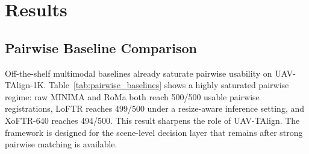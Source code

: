 
\section{Results}

\subsection{Pairwise Baseline Comparison}

Off-the-shelf multimodal baselines already saturate pairwise usability on UAV-TAlign-1K.
Table~\ref{tab:pairwise_baselines} shows a highly saturated pairwise regime: raw MINIMA and RoMa
both reach 500/500 usable pairwise registrations, LoFTR reaches 499/500 under a resize-aware
inference setting, and XoFTR-640 reaches 494/500. This result sharpens the role of UAV-TAlign. The
framework is designed for the scene-level decision layer that remains after strong pairwise
matching is available.

\begin{table}[t]
\caption{Pairwise baseline comparison on 500 RGB-thermal pairs. Red/orange/yellow cells mark the
best, second, and third values for each metric; arrows indicate the preferred direction.}
\label{tab:pairwise_baselines}
\centering
{}
\end{table}

